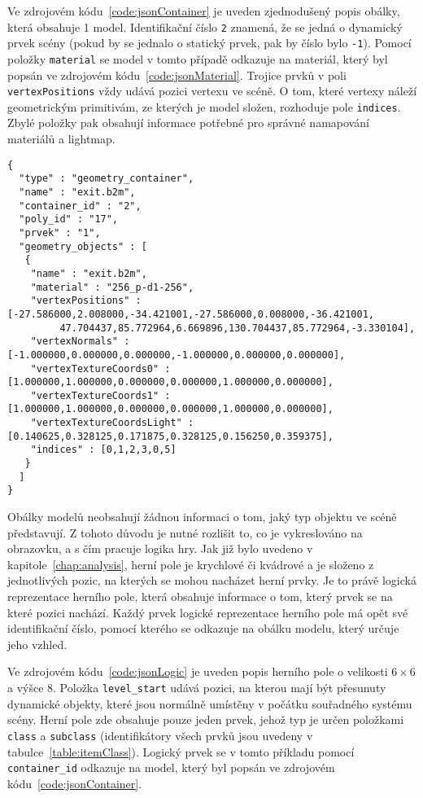 Ve zdrojovém kódu~\ref{code:jsonContainer} je uveden zjednodušený popis obálky, která obsahuje 1 model. Identifikační číslo \texttt{2} znamená, že se jedná o dynamický prvek scény (pokud by se jednalo o statický prvek, pak by číslo bylo \texttt{-1}). Pomocí položky \texttt{material} se model v tomto případě odkazuje na materiál, který byl popsán ve zdrojovém kódu~\ref{code:jsonMaterial}. Trojice prvků v poli \texttt{vertexPositions} vždy udává pozici vertexu ve scéně. O tom, které vertexy náleží geometrickým primitivám, ze kterých je model složen, rozhoduje pole \texttt{indices}. Zbylé položky pak obsahují informace potřebné pro správné namapování materiálů a lightmap.

\begin{lstlisting}[caption=Objekt \texttt{geometry\_container} vstupního souboru JSON,label=code:jsonContainer]
{
  "type" : "geometry_container",
  "name" : "exit.b2m",
  "container_id" : "2",
  "poly_id" : "17",
  "prvek" : "1",
  "geometry_objects" : [
   {
    "name" : "exit.b2m",
    "material" : "256_p-d1-256",
    "vertexPositions" : [-27.586000,2.008000,-34.421001,-27.586000,0.008000,-36.421001,
         47.704437,85.772964,6.669896,130.704437,85.772964,-3.330104],
    "vertexNormals" : [-1.000000,0.000000,0.000000,-1.000000,0.000000,0.000000],
    "vertexTextureCoords0" : [1.000000,1.000000,0.000000,0.000000,1.000000,0.000000],
    "vertexTextureCoords1" : [1.000000,1.000000,0.000000,0.000000,1.000000,0.000000],
    "vertexTextureCoordsLight" : [0.140625,0.328125,0.171875,0.328125,0.156250,0.359375],
    "indices" : [0,1,2,3,0,5]
   }
  ]
}
\end{lstlisting}

Obálky modelů neobsahují žádnou informaci o tom, jaký typ objektu ve scéně představují. Z tohoto důvodu je nutné rozlišit to, co je vykreslováno na obrazovku, a s čím pracuje logika hry. Jak již bylo uvedeno v kapitole~\ref{chap:analysis}, herní pole je krychlové či kvádrové a je složeno z jednotlivých pozic, na kterých se mohou nacházet herní prvky. Je to právě logická reprezentace herního pole, která obsahuje informace o tom, který prvek se na které pozici nachází. Každý prvek logické reprezentace herního pole má opět své identifikační číslo, pomocí kterého se odkazuje na obálku modelu, který určuje jeho vzhled.  

Ve zdrojovém kódu~\ref{code:jsonLogic} je uveden popis herního pole o velikosti $6\times6$ a výšce $8$. Položka \texttt{level\_start} udává pozici, na kterou mají být přesunuty dynamické objekty, které jsou normálně umístěny v počátku souřadného systému scény. Herní pole zde obsahuje pouze jeden prvek, jehož typ je určen položkami \texttt{class} a \texttt{subclass} (identifikátory všech prvků jsou uvedeny v tabulce~\ref{table:itemClass}). Logický prvek se v tomto příkladu pomocí \texttt{container\_id} odkazuje na model, který byl popsán ve zdrojovém kódu~\ref{code:jsonContainer}. 

